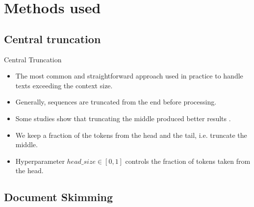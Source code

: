 \section{Methods used}


\subsection{Central truncation}

\begin{frame}{Central Truncation}

	\begin{itemize}
		\item The most common and straightforward approach used in practice to handle
		texts exceeding the context size.
		\item Generally, sequences are truncated from the end before processing.
		\item Some studies show that truncating the middle produced better results
		\citep{sun2019fine, worsham-kalita-2018-genre}.
		\item We keep a fraction of the tokens from the head and the tail, i.e. truncate
		the middle.
		\item Hyperparameter $head\_size \in [0, 1]$ controls the fraction of tokens taken
		from the head.
	\end{itemize}

\end{frame}


\subsection{Document Skimming}


